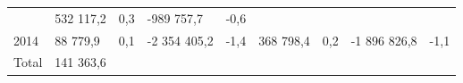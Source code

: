 \begin{longtable}[]{@{}lllllllll@{}}
\begin{minipage}[t]{0.06\columnwidth}
\end{minipage} & \begin{minipage}[t]{0.12\columnwidth}\raggedright
532 117,2\strut
\end{minipage} & \begin{minipage}[t]{0.06\columnwidth}\raggedright
0,3\strut
\end{minipage} & \begin{minipage}[t]{0.10\columnwidth}\raggedright
-989 757,7\strut
\end{minipage} & \begin{minipage}[t]{0.06\columnwidth}\raggedright
-0,6\strut
\end{minipage}\tabularnewline
\begin{minipage}[t]{0.05\columnwidth}\raggedright
2014\strut
\end{minipage} & \begin{minipage}[t]{0.10\columnwidth}\raggedright
88 779,9\strut
\end{minipage} & \begin{minipage}[t]{0.06\columnwidth}\raggedright
0,1\strut
\end{minipage} & \begin{minipage}[t]{0.16\columnwidth}\raggedright
-2 354 405,2\strut
\end{minipage} & \begin{minipage}[t]{0.06\columnwidth}\raggedright
-1,4\strut
\end{minipage} & \begin{minipage}[t]{0.12\columnwidth}\raggedright
368 798,4\strut
\end{minipage} & \begin{minipage}[t]{0.06\columnwidth}\raggedright
0,2\strut
\end{minipage} & \begin{minipage}[t]{0.10\columnwidth}\raggedright
-1 896 826,8\strut
\end{minipage} & \begin{minipage}[t]{0.06\columnwidth}\raggedright
-1,1\strut
\end{minipage}\tabularnewline
\begin{minipage}[t]{0.05\columnwidth}\raggedright
Total\strut
\end{minipage} & \begin{minipage}[t]{0.10\columnwidth}\raggedright
141 363,6\strut
\end{minipage} & \begin{minipage}[t]{0.06\columnwidth}\raggedright
\strut
\end{minipage} & \begin{minipage}[t]{0.16\columnwidth}\raggedright

\end{minipage}
\end{longtable}
